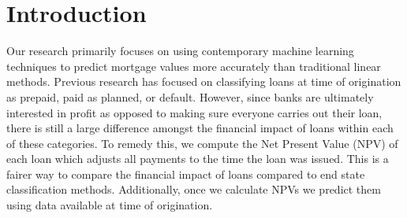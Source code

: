\documentclass[12 pt]{uncw_thesis}
\theoremstyle{plain}
\theoremstyle{remark}
\theoremstyle{definition}
\begin{document}
\section{Introduction}
\thispagestyle{plain}
Our research primarily focuses on using contemporary machine learning techniques to  predict mortgage values more accurately than traditional linear methods. Previous research has focused on classifying loans at time of origination as prepaid, paid as planned, or default\cite{Deng}. However, since banks are ultimately interested in profit as opposed to making sure everyone carries out their loan, there is still a large difference amongst the financial impact of loans within each of these categories. To remedy this, we compute the Net Present Value (NPV) of each loan which adjusts all payments to the time the loan was issued. This is a fairer way to compare the financial impact of loans compared to end state classification methods. Additionally, once we calculate NPVs we predict them using data available at time of origination. 
\end{document}
